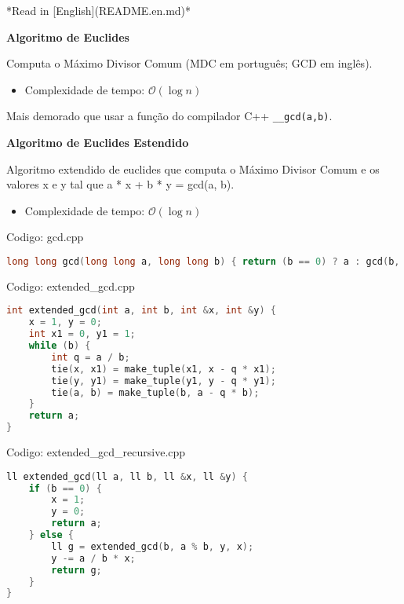 \documentclass[10pt, a4paper, oneside]{book}
\begin{document}
*Read in [English](README.en.md)*



\textbf{Algoritmo de Euclides} 



Computa o Máximo Divisor Comum (MDC em português; GCD em inglês).



\begin{itemize}
\item Complexidade de tempo: $\mathcal{O}(\log n)$
\end{itemize}



Mais demorado que usar a função do compilador C++ \texttt{\_\_gcd(a,b)}.



\textbf{Algoritmo de Euclides Estendido} 



Algoritmo extendido de euclides que computa o Máximo Divisor Comum e os valores x e y tal que a * x + b * y = gcd(a, b).



\begin{itemize}
\item Complexidade de tempo: $\mathcal{O}(\log n)$
\end{itemize}

\hfill

Codigo: gcd.cpp

\begin{lstlisting}[language=C++]
long long gcd(long long a, long long b) { return (b == 0) ? a : gcd(b, a % b); }
\end{lstlisting}
\hfill

Codigo: extended\_gcd.cpp

\begin{lstlisting}[language=C++]
int extended_gcd(int a, int b, int &x, int &y) {
    x = 1, y = 0;
    int x1 = 0, y1 = 1;
    while (b) {
        int q = a / b;
        tie(x, x1) = make_tuple(x1, x - q * x1);
        tie(y, y1) = make_tuple(y1, y - q * y1);
        tie(a, b) = make_tuple(b, a - q * b);
    }
    return a;
}
\end{lstlisting}
\hfill

Codigo: extended\_gcd\_recursive.cpp

\begin{lstlisting}[language=C++]
ll extended_gcd(ll a, ll b, ll &x, ll &y) {
    if (b == 0) {
        x = 1;
        y = 0;
        return a;
    } else {
        ll g = extended_gcd(b, a % b, y, x);
        y -= a / b * x;
        return g;
    }
}
\end{lstlisting}
\hfill
\end{document}
